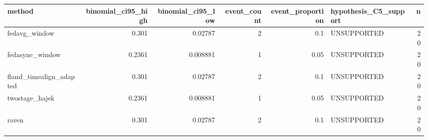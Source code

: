 \begin{tabular}{lrrrrlr}
\toprule
method & binomial_ci95_high & binomial_ci95_low & event_count & event_proportion & hypothesis_C5_support & n \\
\midrule
fedavg_window & 0.301 & 0.02787 & 2 & 0.1 & UNSUPPORTED & 20 \\
fedasync_window & 0.2361 & 0.008881 & 1 & 0.05 & UNSUPPORTED & 20 \\
flamf_timealign_adapted & 0.301 & 0.02787 & 2 & 0.1 & UNSUPPORTED & 20 \\
twostage_hajek & 0.2361 & 0.008881 & 1 & 0.05 & UNSUPPORTED & 20 \\
raven & 0.301 & 0.02787 & 2 & 0.1 & UNSUPPORTED & 20 \\
\bottomrule
\end{tabular}
